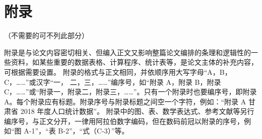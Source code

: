 \chapter*{附\quad 录}
\setlength{\parindent}{2em}

\textcolor[rgb]{1.00,0.00,0.00}{（不需要的可不列此部分）}

附录是与论文内容密切相关、但编入正文又影响整篇论文编排的条理和逻辑性的一些资料，如某些重要的数据表格、计算程序、统计表等，是论文主体的补充内容，可根据需要设置。
附录的格式与正文相同，并依顺序用大写字母“A，B，C，……”或汉字“一，
二，三，……”编序号，如“附录 A，附录 B，附录 C，……”或“附录一，附录二，附录三，……”。只有一个附录时也要编序号，即附录 A。每个附录应有标题。附录序号与附录标题之间空一个字符，例如：“附录 A 甘肃省 2018 年度人口统计数据”。
附录中的图、表、数学表达式、参考文献等另行编序号，与正文分开，一律用阿拉伯数字编码，但在数码前冠以附录的序号，例如“图 A-1”，“表 B-2”，“式（C-3）”等。
